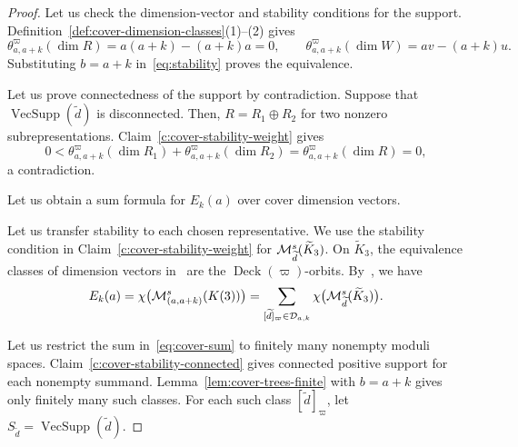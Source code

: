 \begin{proof}
 Let us check the dimension-vector and stability conditions for the support.
Definition~\ref{def:cover-dimension-classes}(1)--(2) gives
\[
 \theta^{\varpi}_{a,a+k}(\dim R)=a(a+k)-(a+k)a=0,
 \qquad\theta^{\varpi}_{a,a+k}(\dim W)=av-(a+k)u.
\]
Substituting $b=a+k$ in~\eqref{eq:stability} proves the equivalence.

 Let us prove connectedness of the support by contradiction.
Suppose that $\operatorname{VecSupp}(\widetilde d)$ is disconnected.
Then, $R=R_1\oplus R_2$ for two nonzero subrepresentations.
Claim~\ref{c:cover-stability-weight} gives
\[
 0<\theta^{\varpi}_{a,a+k}(\dim R_1)+\theta^{\varpi}_{a,a+k}(\dim R_2)
 =\theta^{\varpi}_{a,a+k}(\dim R)=0,
\]
a contradiction.

 Let us obtain a sum formula for $E_k(a)$ over cover dimension vectors.

Let us transfer stability to each chosen representative.
We use the stability condition in Claim~\ref{c:cover-stability-weight}
for $\mathcal M^s_{\widetilde d}(\widetilde K_3)$.
On $\widetilde K_3$, the equivalence classes of dimension vectors in~\cite[Corollary 3.16]{Weist} are the $\operatorname{Deck}(\varpi)$-orbits.
By~\cite[Corollary 3.16]{Weist}, we have
\begin{equation}
 E_k(a)=\chi\bigl(\mathcal M^s_{(a,a+k)}(K(3))\bigr)
 =\sum_{[\widetilde d]_{\varpi}\in\mathcal D_{a,k}}
 \chi\bigl(\mathcal M^s_{\widetilde d}(\widetilde K_3)\bigr).
\label{eq:cover-sum}
\end{equation}

Let us restrict the sum in~\eqref{eq:cover-sum} to finitely many nonempty moduli spaces.
Claim~\ref{c:cover-stability-connected} gives connected positive support for each nonempty summand.
Lemma~\ref{lem:cover-trees-finite}
with $b=a+k$ gives only finitely many such classes.
For each such class $[\widetilde d]_{\varpi}$, let $S_{\widetilde d}=\operatorname{VecSupp}(\widetilde d)$.


\end{proof}
